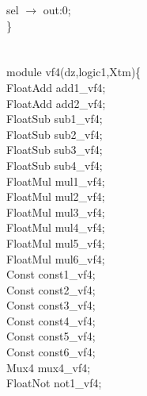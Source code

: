    \hspace*{2em}sel $\rightarrow$ out:0; \\
\} \\
\\
\\
module vf4(dz,logic1,Xtm)\{ \\
\hspace*{2em}FloatAdd add1\_vf4; \\
\hspace*{2em}FloatAdd add2\_vf4; \\
\hspace*{2em}FloatSub sub1\_vf4; \\
\hspace*{2em}FloatSub sub2\_vf4; \\
\hspace*{2em}FloatSub sub3\_vf4; \\
\hspace*{2em}FloatSub sub4\_vf4; \\
\hspace*{2em}FloatMul mul1\_vf4; \\
\hspace*{2em}FloatMul mul2\_vf4; \\
\hspace*{2em}FloatMul mul3\_vf4; \\
\hspace*{2em}FloatMul mul4\_vf4; \\
\hspace*{2em}FloatMul mul5\_vf4; \\
\hspace*{2em}FloatMul mul6\_vf4; \\
\hspace*{2em}Const const1\_vf4; \\
\hspace*{2em}Const const2\_vf4; \\
\hspace*{2em}Const const3\_vf4; \\
\hspace*{2em}Const const4\_vf4; \\
\hspace*{2em}Const const5\_vf4; \\
\hspace*{2em}Const const6\_vf4; \\
\hspace*{2em}Mux4 mux4\_vf4; \\
\hspace*{2em}FloatNot not1\_vf4; \\
